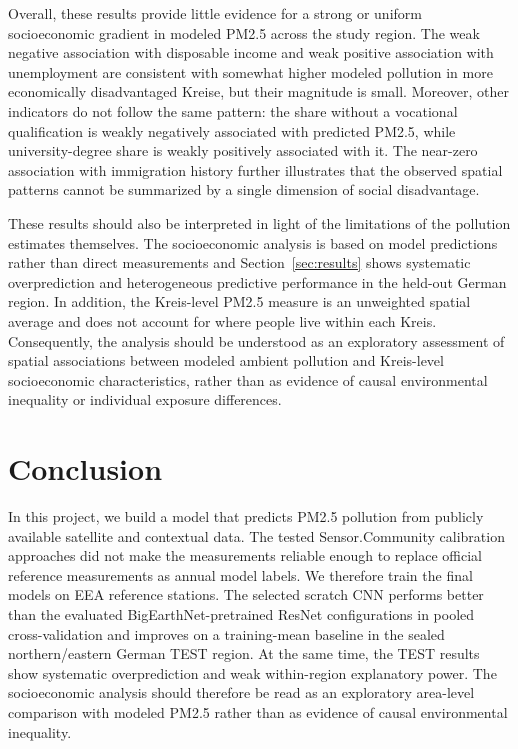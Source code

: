 \documentclass[english, a4paper]{article}
\begin{document}
Overall, these results provide little evidence for a strong or uniform
socioeconomic gradient in modeled PM2.5 across the study region. The weak
negative association with disposable income and weak positive association
with unemployment are consistent with somewhat higher modeled pollution in
more economically disadvantaged Kreise, but their magnitude is small.
Moreover, other indicators do not follow the same pattern: the share without
a vocational qualification is weakly negatively associated with predicted
PM2.5, while university-degree share is weakly positively associated with it.
The near-zero association with immigration history further illustrates that
the observed spatial patterns cannot be summarized by a single dimension of
social disadvantage.

These results should also be interpreted in light of the limitations of the
pollution estimates themselves. The socioeconomic analysis is based on model
predictions rather than direct measurements and Section~\ref{sec:results}
shows systematic overprediction and heterogeneous predictive performance in
the held-out German region. In addition, the Kreis-level PM2.5 measure is an
unweighted spatial average and does not account for where people live within
each Kreis. Consequently, the analysis should be understood as an exploratory
assessment of spatial associations between modeled ambient pollution and
Kreis-level socioeconomic characteristics, rather than as evidence of causal
environmental inequality or individual exposure differences.

\section{Conclusion}

In this project, we build a model that predicts PM2.5 pollution from publicly available satellite and contextual data. The tested Sensor.Community calibration approaches did not make the measurements reliable enough to replace official reference measurements as annual model labels. We therefore train the final models on EEA reference stations. The selected scratch CNN performs better than the evaluated BigEarthNet-pretrained ResNet configurations in pooled cross-validation and improves on a training-mean baseline in the sealed northern/eastern German TEST region. At the same time, the TEST results show systematic overprediction and weak within-region explanatory power. The socioeconomic analysis should therefore be read as an exploratory area-level comparison with modeled PM2.5 rather than as evidence of causal environmental inequality.
\end{document}
